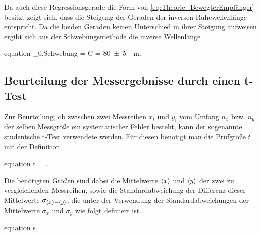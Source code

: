  	Da auch diese Regressionsgerade die Form von \cref{eq:Theorie_BewegterEmpfänger} besitzt zeigt
 	sich, dass die Steigung der Geraden der inversen Ruhewellenlänge entspricht. 
	Da die beiden Geraden keinen Unterschied in ihrer Steigung aufweisen ergibt sich aus der Schwebungsmethode
	die inverse Wellenlänge
	\begin{empheq}{equation}
		\label{eq:Auswertung_InverseWellenlänge_Schwebung}
		\lambda_{0,Schwebung} = C = \SI{80(5)}{\per\meter}.
	\end{empheq}

\subsection{Beurteilung der Messergebnisse durch einen t-Test}
	
	Zur Beurteilung, ob zwischen zwei Messreihen $x_{i}$ und $y_{i}$ vom Umfang $n_{x}$ bzw. $n_{y}$ 
	der selben Messgröße ein systematischer Fehler besteht, kann der sogenannte studentsche t-Test verwendete werden.
	Für diesen benötigt man die Prüfgröße $t$ mit der Definition
	\begin{empheq}{equation}
		\label{eq:Auswertung_tTest_t}
		t = .
	\end{empheq} 	
	Die benötigten Größen sind dabei die Mittelwerte $\langle x\rangle$ und $\langle y\rangle$ der zwei zu vergleichenden Messreihen,
	sowie die Standardabweichung der Differenz dieser Mittelwerte $\sigma_{\langle x\rangle - \langle y\rangle}$, die unter der 
	Verwendung der Standardabweichungen der Mittelwerte $\sigma_{x}$ und $\sigma_{y}$ wie folgt definiert ist.
	\begin{empheq}{equation}
		\label{eq:Auswertung_tTest_s}
		s = 
	\end{empheq} 
	
	
	
	
	
	
	
	
	
	
	
	
	
	
	
	
	
	
	
	
	
	
	
	
	
	
	
	
	
	
	 